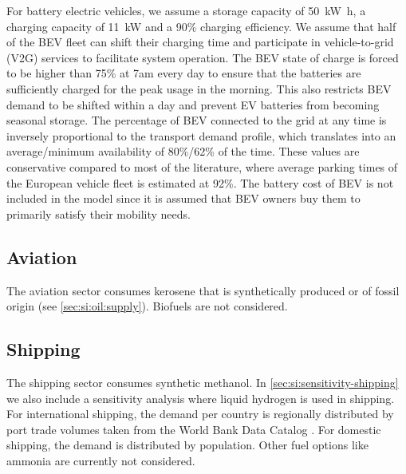 For battery electric vehicles, we assume a storage capacity of
\SI{50}{\kilo\watt\hour}, a charging capacity of \SI{11}{\kilo\watt} and a 90\%
charging efficiency. We assume that half of the BEV fleet can shift their
charging time and participate in vehicle-to-grid (V2G) services to facilitate
system operation. The BEV state of charge is forced to be higher than 75\% at
7am every day to ensure that the batteries are sufficiently charged for the peak
usage in the morning. This also restricts BEV demand to be shifted within a day
and prevent EV batteries from becoming seasonal storage. The percentage of BEV
connected to the grid at any time is inversely proportional to the transport
demand profile, which translates into an average/minimum availability of
80\%/62\% of the time. These values are conservative compared to most of the
literature, where average parking times of the European vehicle fleet is
estimated at 92\%. The battery cost of BEV is not included in the model
since it is assumed that BEV owners buy them to primarily satisfy their mobility
needs.

\subsection{Aviation}
\label{sec:si:transport:aviation}

The aviation sector consumes kerosene that is synthetically produced or of
fossil origin (see \cref{sec:si:oil:supply}). Biofuels are not considered.

\subsection{Shipping}
\label{sec:si:transport:shipping}

The shipping sector consumes synthetic methanol. In
\cref{sec:si:sensitivity-shipping} we also include a sensitivity analysis where
liquid hydrogen is used in shipping. For international shipping, the demand per
country is regionally distributed by port trade volumes taken from the World
Bank Data Catalog . For domestic shipping, the demand is
distributed by population. Other fuel options like ammonia are currently not
considered.